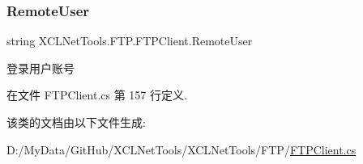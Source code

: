 \subsubsection{\texorpdfstring{Remote\+User}{RemoteUser}}
{\footnotesize\ttfamily string X\+C\+L\+Net\+Tools.\+F\+T\+P.\+F\+T\+P\+Client.\+Remote\+User\hspace{0.3cm}{\ttfamily [set]}}



登录用户账号 



在文件 F\+T\+P\+Client.\+cs 第 157 行定义.



该类的文档由以下文件生成\+:\begin{DoxyCompactItemize}
\item 
D\+:/\+My\+Data/\+Git\+Hub/\+X\+C\+L\+Net\+Tools/\+X\+C\+L\+Net\+Tools/\+F\+T\+P/\hyperlink{_f_t_p_client_8cs}{F\+T\+P\+Client.\+cs}\end{DoxyCompactItemize}
